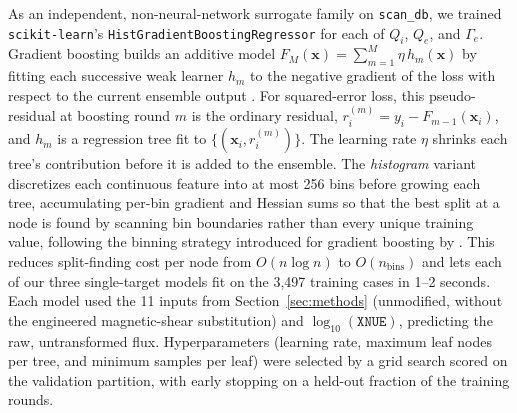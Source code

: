 \documentclass[12pt,letterpaper]{article}
\begin{document}
As an independent, non-neural-network surrogate family on \texttt{scan\_db},
we trained \texttt{scikit-learn}'s \texttt{HistGradientBoostingRegressor} for
each of $Q_i$, $Q_e$, and $\Gamma_e$. Gradient boosting builds an additive
model $F_M(\mathbf{x}) = \sum_{m=1}^{M} \eta\, h_m(\mathbf{x})$ by fitting each
successive weak learner $h_m$ to the negative gradient of the loss with
respect to the current ensemble output \citep{friedman2001}. For squared-error
loss, this pseudo-residual at boosting round $m$ is the ordinary residual,
$r_i^{(m)} = y_i - F_{m-1}(\mathbf{x}_i)$, and $h_m$ is a regression tree fit
to $\{(\mathbf{x}_i, r_i^{(m)})\}$. The learning rate $\eta$ shrinks each
tree's contribution before it is added to the ensemble. The
\emph{histogram} variant discretizes each continuous feature into at most 256
bins before growing each tree, accumulating per-bin gradient and Hessian sums
so that the best split at a node is found by scanning bin boundaries rather
than every unique training value, following the binning strategy introduced
for gradient boosting by \citet{ke2017lightgbm}. This reduces split-finding
cost per node from $O(n\log n)$ to $O(n_{\text{bins}})$ and lets each of our
three single-target models fit on the 3,497 training cases in 1--2 seconds.
Each model used the 11 inputs from Section~\ref{sec:methods} (unmodified,
without the engineered magnetic-shear substitution) and $\log_{10}(\mathtt{XNUE})$,
predicting the raw, untransformed flux. Hyperparameters (learning rate,
maximum leaf nodes per tree, and minimum samples per leaf) were selected by a
grid search scored on the validation partition, with early stopping on a
held-out fraction of the training rounds.
\end{document}
